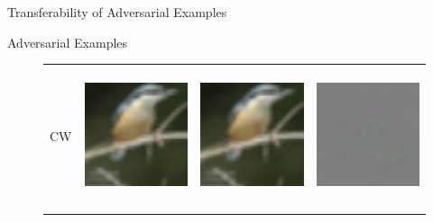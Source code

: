 \documentclass[final]{beamer}
\newlength{\onecolwid}
\newlength{\twocolwid}
\begin{document}
\begin{frame}[t]
\begin{columns}[t]
\begin{column}{\twocolwid}
\begin{columns}[t,totalwidth=\twocolwid]
\begin{column}{\onecolwid}
\begin{block}{Transferability of Adversarial Examples}
						
						
						
					\end{block}
					
					\begin{block}{Adversarial Examples}
						\begin{figure}[h]
							\centering
							\begin{tabular}{rlll} 
								CW & \includegraphics[height=4cm, align=c]{../figures/carlini_wagner_orig.pdf} & \includegraphics[height=4cm, align=c]{../figures/carlini_wagner_adversarial.pdf} & \includegraphics[height=4cm, align=c]{../figures/carlini_wagner_diff.pdf}\\
								\\

\end{tabular}
\end{figure}
\end{block}
\end{column}
\end{columns}
\end{column}
\end{columns}
\end{frame}
\end{document}
